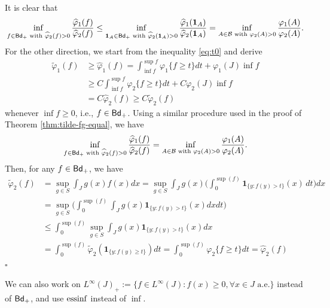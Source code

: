 \documentclass[12pt,a4paper]{article}
\newenvironment{proof}{\medskip\noindent{\bf Proof. }}{\hfill$\square$\medskip}
\begin{document}
\begin{proof}
It is clear that 
\begin{align*}
 \inf_{f\in {\sf Bd}_+ \text{ with }\widehat{\varphi}_2(f)>0}\frac{\widehat{\varphi}_1(f)}{\widehat{\varphi}_2(f)}
\le \inf_{{\bf1}_A\in {\sf Bd}_+ \text{ with }\widehat{\varphi}_2({\bf1}_A)>0}\frac{\widehat{\varphi}_1({\bf1}_A)}{\widehat{\varphi}_2({\bf1}_A)} =\inf_{A\in\mathcal{B}\text{ with }\varphi_2(A)>0}\frac{\varphi_1(A)}{\varphi_2(A)}.
\end{align*}
For the other direction, we start from the inequality \eqref{eq:t0} and derive \begin{align*}
\widetilde{\varphi}_1(f)&\ge\widehat{\varphi}_1(f)=\int_{\inf f}^{\sup f} \varphi_1\{f\ge t\}dt+\varphi_1(J)\inf f
\\&\ge C\int_{\inf f}^{\sup f} \varphi_2\{f\ge t\}dt+C\varphi_2(J)\inf f
\\&=C \widehat{\varphi}_2(f)\ge C \widetilde{\varphi}_2(f)
\end{align*}
whenever  $\inf f\ge0$, i.e., $f\in{\sf Bd}_+$. Using a similar procedure used in the proof of Theorem \ref{thm:tilde-fg-equal}, %
we have 
$$\inf_{f\in {\sf Bd}_+ \text{ with }\widehat{\varphi}_2(f)>0}\frac{\widehat{\varphi}_1(f)}{\widehat{\varphi}_2(f)}=\inf_{A\in\mathcal{B}\text{ with }\varphi_2(A)>0}\frac{\varphi_1(A)}{\varphi_2(A)}.    
$$
Then, for any $f\in{\sf Bd}_+$, we have 
\begin{align*}
\widetilde{\varphi}_2(f)&=\sup_{g\in S}\int_J g(x)f(x)dx  =\sup_{g\in S}\int_J g(x)\Big(\int_{0}^{\sup(f)} \mathbf{1}_{\{y: f(y) > t\}}(x) \, dt\Big)dx 
\\&=\sup_{g\in S}\Big(\int_{0}^{\sup(f)} \int_J g(x)\mathbf{1}_{\{y: f(y) > t\}}(x)dx  dt\Big) 
\\&\le \int_{0}^{\sup(f)}\sup_{g\in S} \int_J g(x)\mathbf{1}_{\{y: f(y) > t\}}(x)dx
\\&=\int_{0}^{\sup(f)} \widetilde{\varphi}_2(\mathbf{1}_{\{y: f(y) \ge t\}}) dt=\int_{0}^{\sup(f)} \varphi_2\{f \ge t\} dt = \widehat{\varphi}_2(f)
\end{align*}
\end{proof}

We can also work on  $L^\infty(J) _+:=\{f\in L^\infty(J):f(x)\ge 0,\forall x\in J\text{ a.e.}\}$ instead of ${\sf Bd}_+$, and use $\mathop{\mathrm{essinf}}$ instead of $\inf$. 
\end{document}
